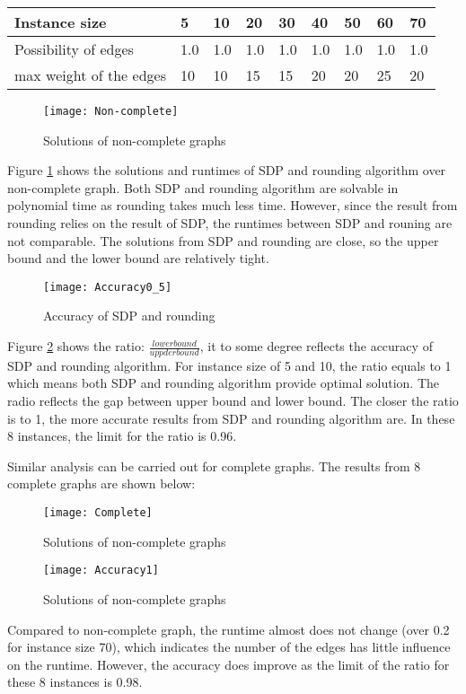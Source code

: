\documentclass[11pt]{article}
\begin{document}
\begin{tabular}{|l|l|l|l|l|l|l|l|l|}
\hline
Instance size & 5   & 10  & 20  & 30  & 40  & 50  & 60  & 70  \\ \hline
Possibility of edges        & 1.0 & 1.0 & 1.0 & 1.0 & 1.0 & 1.0 & 1.0 & 1.0 \\ \hline
max weight of the edges     & 10  & 10  & 15  & 15  & 20  & 20  & 25  & 20  \\ \hline
\end{tabular}
\begin{figure}[H] 
    \texttt{[image: Non-complete]}
	\caption{Solutions of non-complete graphs}
	\label{fig:1} %
\end{figure}
Figure \ref{fig:1} shows the solutions and runtimes of SDP and rounding algorithm over non-complete graph. Both SDP and rounding algorithm are solvable in polynomial time as rounding takes much less time. However, since the result from rounding relies on the result of SDP, the runtimes between SDP and rouning are not comparable. The solutions from SDP and rounding are close, so the upper bound and the lower bound are relatively tight.
\begin{figure}[H]
    \texttt{[image: Accuracy0\_5]}
	\caption{Accuracy of SDP and rounding }
	\label{fig:2} %
\end{figure}
Figure \ref{fig:2} shows the ratio: $\frac{lower bound}{uppder bound}$, it to some degree reflects the accuracy of SDP and rounding algorithm. For instance size of 5 and 10, the ratio equals to 1 which means both SDP and rounding algorithm provide optimal solution. The radio reflects the gap between upper bound and lower bound. The closer the ratio is to 1, the more accurate results from SDP and rounding algorithm are. In these 8 instances, the limit for the ratio is 0.96.

Similar analysis can be carried out for complete graphs. The results from 8 complete graphs are shown below:
\begin{figure}[H] 
    \texttt{[image: Complete]}
	\caption{Solutions of non-complete graphs}
	\label{fig:3} %
\end{figure}
\begin{figure}[H] 
    \texttt{[image: Accuracy1]}
	\caption{Solutions of non-complete graphs}
	\label{fig:4} %
\end{figure}
Compared to non-complete graph, the runtime almost does not change (over 0.2 for instance size 70), which indicates the number of the edges has little influence on the runtime. However, the accuracy does improve as the limit of the ratio for these 8 instances is 0.98.
\end{document}
